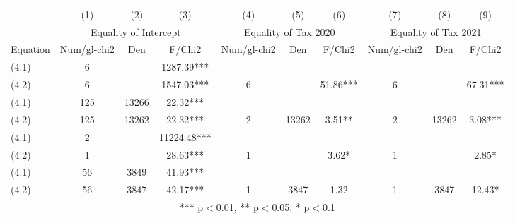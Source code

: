 \begin{tabular}{lccccccccc} \hline
& (1) & (2) & (3) & (4) & (5) & (6)  & (7) & (8) & (9) \\
&\multicolumn{3}{c}{Equality of Intercept} &\multicolumn{3}{c}{Equality of Tax 2020} &\multicolumn{3}{c}{Equality of Tax 2021}\\
Equation&Num/gl-chi2&Den&F/Chi2&Num/gl-chi2&Den&F/Chi2&Num/gl-chi2&Den&F/Chi2\\
(4.1)&6&&1287.39***\\
(4.2)&6&&1547.03***&6&&51.86***&6&&67.31***\\
(4.1)&125&13266&22.32***\\
(4.2)&125&13262&22.32***&2&13262&3.51**&2&13262&3.08***\\
(4.1)&2&&11224.48***\\
(4.2)&1&&28.63***&1&&3.62*&1&&2.85*\\
(4.1)&56&3849&41.93***\\
(4.2)&56&3847&42.17***&1&3847&1.32&1&3847&12.43*\\
\hline
\multicolumn{10}{c}{ *** p$<$0.01, ** p$<$0.05, * p$<$0.1} \\
\end{tabular}
